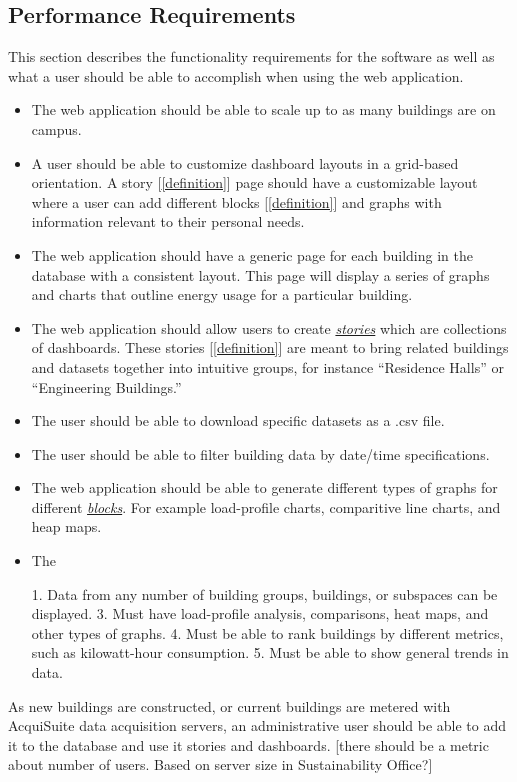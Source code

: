 \documentclass[onecolumn, draftclsnofoot,10pt, compsoc]{IEEEtran}
\begin{document}
    \subsection{Performance Requirements}
    This section describes the functionality requirements for the software as well as what a user should be able to accomplish when using the web application.
    \begin{itemize}
        \item The web application should be able to scale up to as many buildings are on campus.
        \item A user should be able to customize dashboard layouts in a grid-based orientation. A story [\ref{definition}] page should have a customizable layout where a user can add different blocks [\ref{definition}] and graphs with information relevant to their personal needs.
        \item The web application should have a generic page for each building in the database with a consistent layout. This page will display a series of graphs and charts that outline energy usage for a particular building.
        \item The web application should allow users to create \hyperref[definition]{\textit{stories}} which are collections of dashboards. These stories [\ref{definition}] are meant to bring related buildings and datasets together into intuitive groups, for instance ``Residence Halls'' or ``Engineering Buildings.''
        \item The user should be able to download specific datasets as a .csv file.
        \item The user should be able to filter building data by date/time specifications.
        \item The web application should be able to generate different types of graphs for different \hyperref[definition]{\textit{blocks}}. For example load-profile charts, comparitive line charts, and heap maps.
        \item The 

        1. Data from any number of building groups, buildings, or subspaces can be displayed.
        3. Must have load-profile analysis, comparisons, heat maps, and other types of graphs.
        4. Must be able to rank buildings by different metrics, such as kilowatt-hour consumption.
        5. Must be able to show general trends in data.
    \end{itemize}

     As new buildings are constructed, or current buildings are metered with AcquiSuite data acquisition servers, an administrative user should be able to add it to the database and use it stories and dashboards.  
    [there should be a metric about number of users. Based on server size in Sustainability Office?]
    
\end{document}
